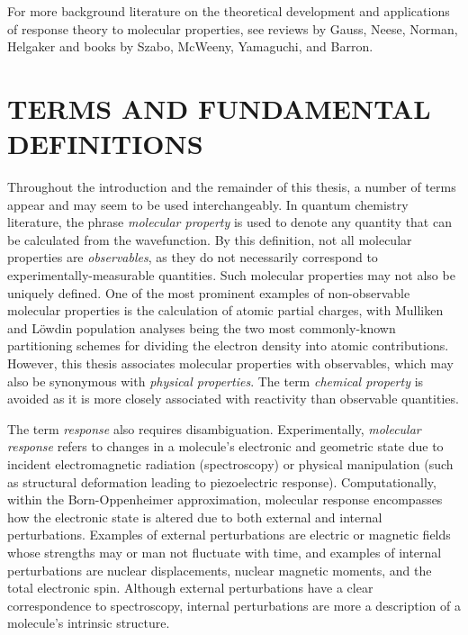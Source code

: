 \documentclass[%
class = book,%
crop = false,%
float = true,%
multi = true,%
preview = false,%
]{standalone}
\let\cite\autocite
\newcommand{\caps}[1]{\uppercase{#1}}
\begin{document}
For more background literature on the theoretical development and applications of response theory to molecular properties, see reviews by Gauss\cite{gauss2000}, Neese\cite{NEESE2009526}, Norman\cite{C1CP21951K}, Helgaker\cite{doi:10.1021/cr2002239} and books by Szabo\cite{szabo1989modern}, McWeeny\cite{mcweeny1989methods}, Yamaguchi\cite{Yamaguchi1994}, and Barron\cite{barron2004molecular}.

\section{\texorpdfstring{\caps{Terms and Fundamental Definitions}}{Terms and Fundamental Definitions}}

Throughout the introduction and the remainder of this thesis, a number of terms appear and may seem to be used interchangeably. In quantum chemistry literature, the phrase \emph{molecular property} is used to denote any quantity that can be calculated from the wavefunction. By this definition, not all molecular properties are \emph{observables}, as they do not necessarily correspond to experimentally-measurable quantities. Such molecular properties may not also be uniquely defined. One of the most prominent examples of non-observable molecular properties is the calculation of atomic partial charges, with Mulliken and L{\"{o}}wdin population analyses being the two most commonly-known partitioning schemes for dividing the electron density into atomic contributions. However, this thesis associates molecular properties with observables, which may also be synonymous with \emph{physical properties}. The term \emph{chemical property} is avoided as it is more closely associated with reactivity than observable quantities.

The term \emph{response} also requires disambiguation. Experimentally, \emph{molecular response} refers to changes in a molecule's electronic and geometric state due to incident electromagnetic radiation (spectroscopy) or physical manipulation (such as structural deformation leading to piezoelectric response)\cite{doi:10.1021/jz400355v,doi:10.1021/jp412740j,doi:10.1021/acs.jpcb.7b10085}. Computationally, within the Born-Oppenheimer approximation, molecular response encompasses how the electronic state is altered due to both external and internal perturbations. Examples of external perturbations are electric or magnetic fields whose strengths may or man not fluctuate with time, and examples of internal perturbations are nuclear displacements, nuclear magnetic moments, and the total electronic spin. Although external perturbations have a clear correspondence to spectroscopy, internal perturbations are more a description of a molecule's intrinsic structure.
\end{document}
